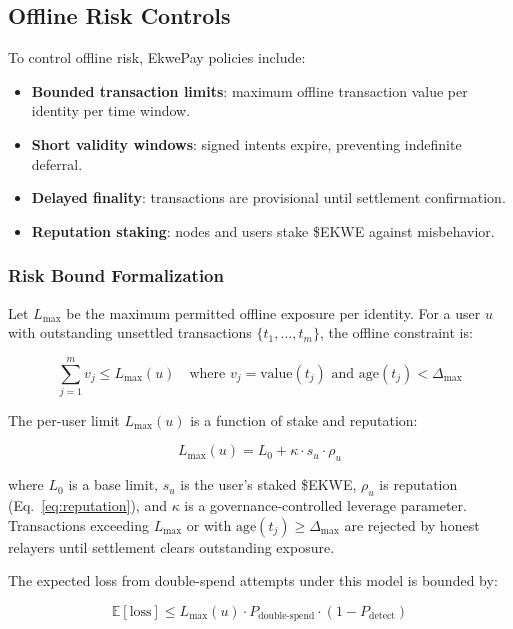 \documentclass[11pt,a4paper]{article}
\begin{document}
\subsection{Offline Risk Controls}

To control offline risk, EkwePay policies include:
\begin{itemize}[nosep]
  \item \textbf{Bounded transaction limits}: maximum offline transaction value per identity per time window.
  \item \textbf{Short validity windows}: signed intents expire, preventing indefinite deferral.
  \item \textbf{Delayed finality}: transactions are provisional until settlement confirmation.
  \item \textbf{Reputation staking}: nodes and users stake \$EKWE against misbehavior.
\end{itemize}

\subsubsection{Risk Bound Formalization}

Let $L_{\max}$ be the maximum permitted offline exposure per identity. For a user $u$ with outstanding unsettled transactions $\{t_1, \ldots, t_m\}$, the offline constraint is:

\begin{equation}
\sum_{j=1}^{m} v_j \leq L_{\max}(u) \quad \text{where } v_j = \text{value}(t_j) \text{ and } \text{age}(t_j) < \Delta_{\max}
\label{eq:offline_limit}
\end{equation}

The per-user limit $L_{\max}(u)$ is a function of stake and reputation:

\begin{equation}
L_{\max}(u) = L_0 + \kappa \cdot s_u \cdot \rho_u
\label{eq:user_limit}
\end{equation}

where $L_0$ is a base limit, $s_u$ is the user's staked \$EKWE, $\rho_u$ is reputation (Eq.~\ref{eq:reputation}), and $\kappa$ is a governance-controlled leverage parameter. Transactions exceeding $L_{\max}$ or with $\text{age}(t_j) \geq \Delta_{\max}$ are rejected by honest relayers until settlement clears outstanding exposure.

The expected loss from double-spend attempts under this model is bounded by:

\begin{equation}
\mathbb{E}[\text{loss}] \leq L_{\max}(u) \cdot P_{\text{double-spend}} \cdot (1 - P_{\text{detect}})
\label{eq:expected_loss}
\end{equation}
\end{document}
